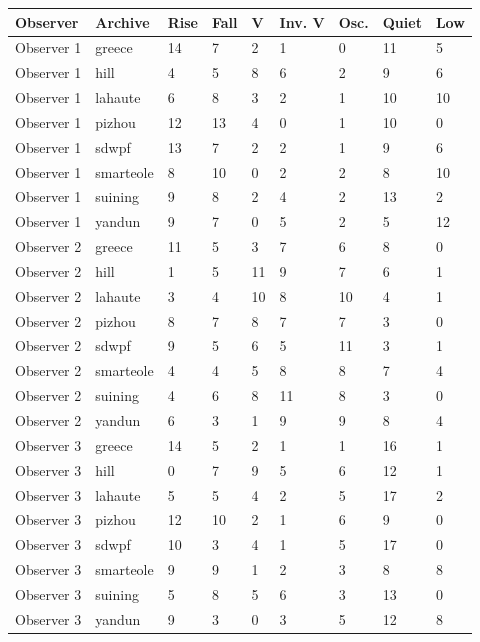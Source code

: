 \documentclass[a4paper,11pt]{article}
\newcounter{none}
\begin{document}
{\def\LTcaptype{none} %
\begin{longtable}[]{@{}lllllllll@{}}
\toprule\noalign{}
Observer & Archive & Rise & Fall & V & Inv. V & Osc. & Quiet & Low \\
\midrule\noalign{}
\endhead
\bottomrule\noalign{}
\endlastfoot
Observer 1 & greece & 14 & 7 & 2 & 1 & 0 & 11 & 5 \\
Observer 1 & hill & 4 & 5 & 8 & 6 & 2 & 9 & 6 \\
Observer 1 & lahaute & 6 & 8 & 3 & 2 & 1 & 10 & 10 \\
Observer 1 & pizhou & 12 & 13 & 4 & 0 & 1 & 10 & 0 \\
Observer 1 & sdwpf & 13 & 7 & 2 & 2 & 1 & 9 & 6 \\
Observer 1 & smarteole & 8 & 10 & 0 & 2 & 2 & 8 & 10 \\
Observer 1 & suining & 9 & 8 & 2 & 4 & 2 & 13 & 2 \\
Observer 1 & yandun & 9 & 7 & 0 & 5 & 2 & 5 & 12 \\
Observer 2 & greece & 11 & 5 & 3 & 7 & 6 & 8 & 0 \\
Observer 2 & hill & 1 & 5 & 11 & 9 & 7 & 6 & 1 \\
Observer 2 & lahaute & 3 & 4 & 10 & 8 & 10 & 4 & 1 \\
Observer 2 & pizhou & 8 & 7 & 8 & 7 & 7 & 3 & 0 \\
Observer 2 & sdwpf & 9 & 5 & 6 & 5 & 11 & 3 & 1 \\
Observer 2 & smarteole & 4 & 4 & 5 & 8 & 8 & 7 & 4 \\
Observer 2 & suining & 4 & 6 & 8 & 11 & 8 & 3 & 0 \\
Observer 2 & yandun & 6 & 3 & 1 & 9 & 9 & 8 & 4 \\
Observer 3 & greece & 14 & 5 & 2 & 1 & 1 & 16 & 1 \\
Observer 3 & hill & 0 & 7 & 9 & 5 & 6 & 12 & 1 \\
Observer 3 & lahaute & 5 & 5 & 4 & 2 & 5 & 17 & 2 \\
Observer 3 & pizhou & 12 & 10 & 2 & 1 & 6 & 9 & 0 \\
Observer 3 & sdwpf & 10 & 3 & 4 & 1 & 5 & 17 & 0 \\
Observer 3 & smarteole & 9 & 9 & 1 & 2 & 3 & 8 & 8 \\
Observer 3 & suining & 5 & 8 & 5 & 6 & 3 & 13 & 0 \\
Observer 3 & yandun & 9 & 3 & 0 & 3 & 5 & 12 & 8 \\
\end{longtable}
}
\end{document}
